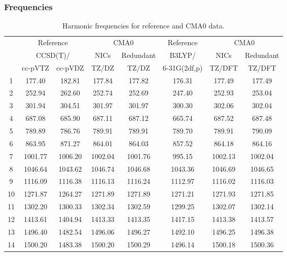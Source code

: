 \documentclass[10pt,oneside]{article}
\begin{document}
\begin{table}[h!]
\subsubsection*{Frequencies}
\centering
\caption{Harmonic frequencies for reference and CMA0 data.}
\begin{tabular}{cccccccc}
\toprule
{} & \multicolumn{2}{c}{Reference} & \multicolumn{2}{c}{CMA0} &    Reference & \multicolumn{2}{c}{CMA0} \\
{} & \multicolumn{2}{c}{CCSD(T)/} &    NICs &  Redundant &       B3LYP/ &    NICs & Redundant \\
{} &   cc-pVTZ & cc-pVDZ &   TZ/DZ &      TZ/DZ & 6-31G(2df,p) &  TZ/DFT &    TZ/DFT \\
\midrule
1  &    177.40 &  182.81 &  177.84 &     177.82 &       176.31 &  177.49 &    177.49 \\
2  &    252.94 &  262.60 &  252.74 &     252.69 &       247.40 &  252.93 &    253.04 \\
3  &    301.94 &  304.51 &  301.97 &     301.97 &       300.30 &  302.06 &    302.04 \\
4  &    687.08 &  685.90 &  687.11 &     687.12 &       665.74 &  687.52 &    687.48 \\
5  &    789.89 &  786.76 &  789.91 &     789.91 &       789.70 &  789.91 &    790.09 \\
6  &    863.95 &  871.27 &  864.01 &     864.03 &       857.52 &  864.18 &    864.16 \\
7  &   1001.77 & 1006.20 & 1002.04 &    1001.76 &       995.15 & 1002.13 &   1002.04 \\
8  &   1046.64 & 1043.62 & 1046.74 &    1046.68 &      1043.36 & 1046.69 &   1046.65 \\
9  &   1116.09 & 1116.38 & 1116.13 &    1116.24 &      1112.97 & 1116.02 &   1116.03 \\
10 &   1271.87 & 1264.27 & 1271.89 &    1271.89 &      1271.21 & 1271.93 &   1271.85 \\
11 &   1302.20 & 1300.33 & 1302.34 &    1302.59 &      1299.25 & 1302.07 &   1302.14 \\
12 &   1413.61 & 1404.94 & 1413.33 &    1413.35 &      1417.15 & 1413.38 &   1413.57 \\
13 &   1496.40 & 1482.54 & 1496.06 &    1496.27 &      1492.10 & 1496.25 &   1496.38 \\
14 &   1500.20 & 1483.38 & 1500.20 &    1500.29 &      1496.14 & 1500.18 &   1500.36 \\

\end{tabular}
\end{table}
\end{document}
